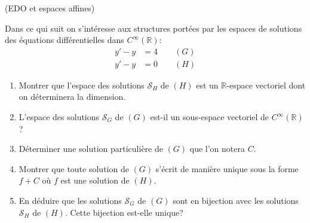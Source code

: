 \documentclass[a4paper,12pt,reqno]{amsart}
\begin{document}
\begin{exo} (EDO et espaces affines)

  Dans ce qui suit on s'intéresse aux structures portées par les espaces de solutions des équations différentielles dans $C^{\infty}(\mathbb{R})$:\vspace{-4mm}
    \begin{align*}
      y' - y &= 4 \qquad (G)\\
      y' - y &= 0 \qquad (H)
    \end{align*}

  \begin{enumerate}
    \item Montrer que l'espace des solutions $\mathcal{S}_{H}$ de $(H)$ est un $\mathbb{R}$-espace vectoriel dont on déterminera la dimension.

    \item L'espace des solutions $\mathcal{S}_{G}$ de $(G)$ est-il un sous-espace vectoriel de $C^{\infty}(\mathbb{R})$?

    \item Déterminer une solution particulière de $(G)$ que l'on notera $C$.

    \item Montrer que toute solution de $(G)$ s'écrit de manière unique sous la forme $f+C$ où $f$ est une solution de $(H)$.

    \item\hard En déduire que les solutions $\mathcal{S}_{G}$ de $(G)$ sont en bijection avec les solutions $\mathcal{S}_{H}$ de $(H)$. Cette bijection est-elle unique?

  \end{enumerate}
\end{exo}
\end{document}
